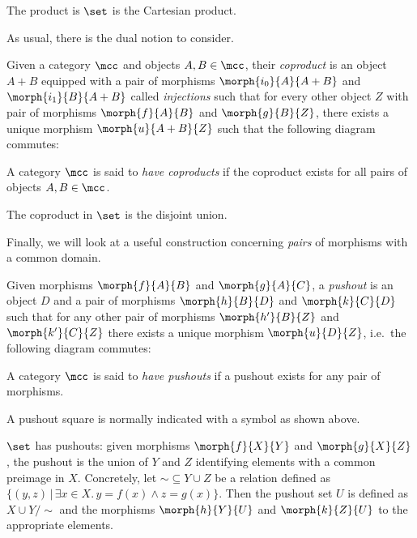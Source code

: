 \begin{example}
    The product is \(\set\) is the Cartesian product.
\end{example}

As usual, there is the dual notion to consider.

\begin{definition}[Coproduct]
    Given a category \(\mcc\) and objects \(A,B \in \mcc\), their \emph{coproduct}
    is an object \(A + B\) equipped with a pair of morphisms
    \(\morph{i_0}{A}{A + B}\) and \(\morph{i_1}{B}{A + B}\) called
    \emph{injections} such that for every other object \(Z\) with pair of
    morphisms \(\morph{f}{A}{B}\) and \(\morph{g}{B}{Z}\), there exists a unique
    morphism \(\morph{u}{A + B}{Z}\) such that the following diagram
    commutes:
    \begin{center}
        
    \end{center}
    A category \(\mcc\) is said to \emph{have coproducts} if the coproduct
    exists for all pairs of objects \(A,B \in \mcc\).
\end{definition}

\begin{example}
    The coproduct in \(\set\) is the disjoint union.
\end{example}

Finally, we will look at a useful construction concerning \emph{pairs} of
morphisms with a common domain.

\begin{definition}[Pushout]
    Given morphisms \(\morph{f}{A}{B}\) and \(\morph{g}{A}{C}\), a
    \emph{pushout} is an object \(D\) and a pair of morphisms
    \(\morph{h}{B}{D}\) and \(\morph{k}{C}{D}\) such that for any other pair of
    morphisms \(\morph{h^\prime}{B}{Z}\) and \(\morph{k^\prime}{C}{Z}\) there
    exists a unique morphism \(\morph{u}{D}{Z}\), i.e.\ the following diagram
    commutes:
    \begin{center}
        
    \end{center}
    A category \(\mcc\) is said to \emph{have pushouts} if a pushout exists for
    any pair of morphisms.
\end{definition}

A pushout square is normally indicated with a \raisebox{-0.25em}{\(\ulcorner\)}
symbol as shown above.

\begin{example}
    \(\set\) has pushouts: given morphisms \(\morph{f}{X}{Y}\) and
    \(\morph{g}{X}{Z}\), the pushout is the union of \(Y\) and \(Z\) identifying
    elements with a common preimage in \(X\).
    Concretely, let \({\sim} \subseteq Y \cup Z\) be a relation defined as
    \(\{(y, z) \,|\, \exists x \in X.\, y = f(x) \wedge z = g(x)\}\).
    Then the pushout set \(U\) is defined as \(X \cup Y / \sim\) and the
    morphisms \(\morph{h}{Y}{U}\) and \(\morph{k}{Z}{U}\) to the appropriate
    elements.
\end{example}

